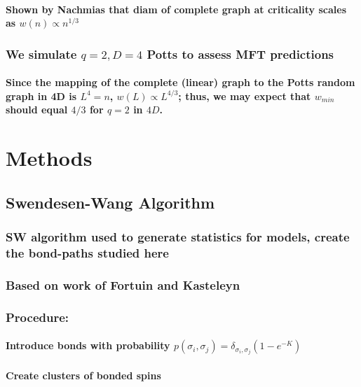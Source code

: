 \documentclass{umthesis}
\begin{document}
\paragraph{Shown by Nachmias \cite{Nachmiasa} that diam of complete graph at criticality scales as $w(n) \propto n^{1/3}$}
\label{sec-3.1.3.5.4}
\subsubsection{We simulate $q=2, D=4$ Potts to assess MFT predictions}
\label{sec-3.1.3.6}
\paragraph{Since the mapping of the complete (linear) graph to the Potts random graph in 4D is $L^4=n$, $w(L) \propto L^{4/3}$; thus, we may expect that $w_{min}$ should equal $4/3$ for $q=2$ in $4D$.}
\label{sec-3.1.3.6.1}
\section{Methods}
\label{sec-3.2}
\subsection{Swendesen-Wang Algorithm}
\label{sec-3.2.1}
\subsubsection{SW algorithm \cite{SwWA} used to generate statistics for models, create the bond-paths studied here}
\label{sec-3.2.1.1}
\subsubsection{Based on work of Fortuin and Kasteleyn \cite{FoKa}}
\label{sec-3.2.1.2}
\subsubsection{Procedure:}
\label{sec-3.2.1.3}
\paragraph{Introduce bonds with probability $p(\sigma_i,\sigma_j) = \delta_{\sigma_i, \sigma_j} (1-e^{-K})$}
\label{sec-3.2.1.3.1}
\paragraph{Create clusters of bonded spins}
\label{sec-3.2.1.3.2}
\end{document}
